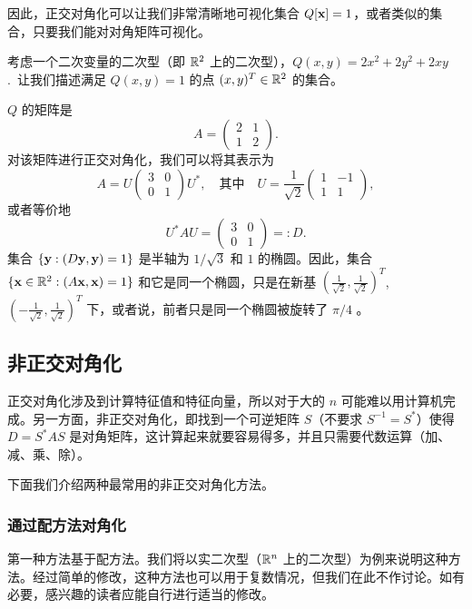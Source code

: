 因此，正交对角化可以让我们非常清晰地可视化集合 $Q[\mathbf{x}] = 1$，或者类似的集合，只要我们能对对角矩阵可视化。

\begin{example*}
考虑一个二次变量的二次型（即 $\mathbb{R}^2$ 上的二次型），$Q(x, y) = 2x^2 + 2y^2 + 2xy$.~让我们描述满足 $Q(x, y) = 1$ 的点 $(x, y)^T \in \mathbb{R}^2$ 的集合。
\end{example*}

$Q$ 的矩阵是
$$A = \begin{pmatrix} 2 & 1 \\ 1 & 2 \end{pmatrix}.$$
对该矩阵进行正交对角化，我们可以将其表示为
$$A = U \begin{pmatrix} 3 & 0 \\ 0 & 1 \end{pmatrix} U^*,\quad\text{其中}\quad U = \frac{1}{\sqrt{2}} \begin{pmatrix} 1 & -1 \\ 1 & 1 \end{pmatrix},$$
或者等价地 $$U^*AU = \begin{pmatrix} 3 & 0 \\ 0 & 1 \end{pmatrix} =: D.$$
集合 $\{\mathbf{y} : (D\mathbf{y}, \mathbf{y}) = 1\}$ 是半轴为 $1/\sqrt{3}$ 和 $1$ 的椭圆。因此，集合 $\{\mathbf{x} \in \mathbb{R}^2 : (A\mathbf{x}, \mathbf{x}) = 1\}$ 和它是同一个椭圆，只是在新基 $(\frac{1}{\sqrt{2}}, \frac{1}{\sqrt{2}})^T$, $(-\frac{1}{\sqrt{2}}, \frac{1}{\sqrt{2}})^T$ 下，或者说，前者只是同一个椭圆被旋转了 $\pi/4$ 。

\subsection{非正交对角化}\label{sec:07-02-02}

正交对角化涉及到计算特征值和特征向量，所以对于大的 $n$ 可能难以用计算机完成。另一方面，非正交对角化，即找到一个可逆矩阵 $S$（不要求 $S^{-1} = S^*$）使得 $D = S^*AS$ 是对角矩阵，这计算起来就要容易得多，并且只需要代数运算（加、减、乘、除）。

下面我们介绍两种最常用的非正交对角化方法。

\subsubsection{通过配方法对角化}\label{sec:07-02-02-01}

第一种方法基于配方法。我们将以实二次型（$\mathbb{R}^n$ 上的二次型）为例来说明这种方法。经过简单的修改，这种方法也可以用于复数情况，但我们在此不作讨论。如有必要，感兴趣的读者应能自行进行适当的修改。

